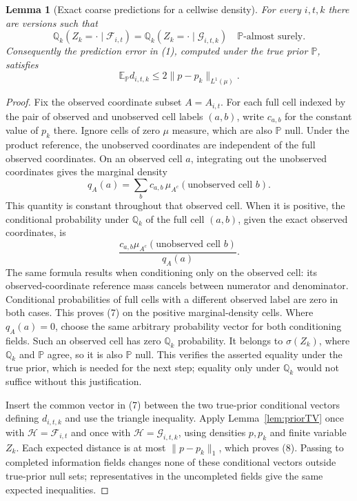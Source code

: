 \documentclass[11pt]{article}
\newtheorem{lemma}[theorem]{Lemma}
\theoremstyle{remark}\newtheorem{remark}[theorem]{Remark}
\newcommand{\E}{\mathbb E}
\newcommand{\Prb}{\mathbb P}
\begin{document}
\begin{lemma}[Exact coarse predictions for a cellwise density]
\label{lem:cellprior}
For every $i,t,k$ there are versions such that
\[
 \mathbb Q_k(Z_k=\cdot\mid\mathcal F_{i,t})
   =\mathbb Q_k(Z_k=\cdot\mid\mathcal G_{i,t,k})
       \quad\Prb\text{-almost surely}.                    \tag{7}
\]
Consequently the prediction error in (1), computed under the true prior
$\Prb$, satisfies
\[
 \E_{\Prb}d_{i,t,k}\leq2\|p-p_k\|_{L^1(\mu)}.           \tag{8}
\]
\end{lemma}
\begin{proof}
Fix the observed coordinate subset $A=A_{i,t}$. For each full cell
indexed by the pair of observed and unobserved cell labels $(a,b)$,
write $c_{a,b}$ for the constant value of $p_k$ there. Ignore cells of
zero $\mu$ measure, which are also $\Prb$ null. Under the product
reference, the unobserved coordinates are independent of the full
observed coordinates. On an observed cell $a$, integrating out the
unobserved coordinates gives the marginal density
\[
 q_A(a)=\sum_b c_{a,b}\,
        \mu_{A^c}(\text{unobserved cell }b).
\]
This quantity is constant throughout that observed cell. When it is
positive, the conditional probability under $\mathbb Q_k$ of the full
cell $(a,b)$, given the exact observed coordinates, is
\[
 \frac{c_{a,b}\mu_{A^c}(\text{unobserved cell }b)}{q_A(a)}.
                                                               \tag{9}
\]
The same formula results when conditioning only on the observed cell:
its observed-coordinate reference mass cancels between numerator and
denominator. Conditional probabilities of full cells with a different
observed label are zero in both cases. This proves (7) on the positive
marginal-density cells. Where $q_A(a)=0$, choose the same arbitrary
probability vector for both conditioning fields. Such an observed cell
has zero $\mathbb Q_k$ probability. It belongs to $\sigma(Z_k)$,
where $\mathbb Q_k$ and $\Prb$ agree, so it is also $\Prb$ null.
This verifies the asserted equality under the true prior, which is
needed for the next step; equality only under $\mathbb Q_k$ would
not suffice without this justification.

Insert the common vector in (7) between the two true-prior conditional
vectors defining $d_{i,t,k}$ and use the triangle inequality. Apply
Lemma~\ref{lem:priorTV} once with $\mathcal H=\mathcal F_{i,t}$
and once with $\mathcal H=\mathcal G_{i,t,k}$, using densities
$p,p_k$ and finite variable $Z_k$. Each expected distance is at most
$\|p-p_k\|_1$, which proves (8). Passing to completed information
fields changes none of these conditional vectors outside true-prior
null sets; representatives in the uncompleted fields give the same
expected inequalities.
\end{proof}
\end{document}
